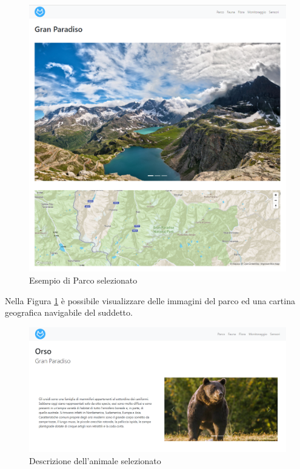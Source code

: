 \newpage
\begin{figure}[ht]   
\centering
\includegraphics[scale=0.9]{Img/Parco.png}
    \caption{Esempio di Parco selezionato}
    \label{parcoselezionato}
\end{figure}

Nella Figura \ref{parcoselezionato} è possibile visualizzare delle immagini del parco ed una cartina geografica navigabile del suddetto.

\newpage

\begin{figure}[ht]   
\centering
\includegraphics[scale=0.45]{Img/Fauna1.png}
    \caption{Descrizione dell'animale selezionato}
    \label{fauna1}
\end{figure}


